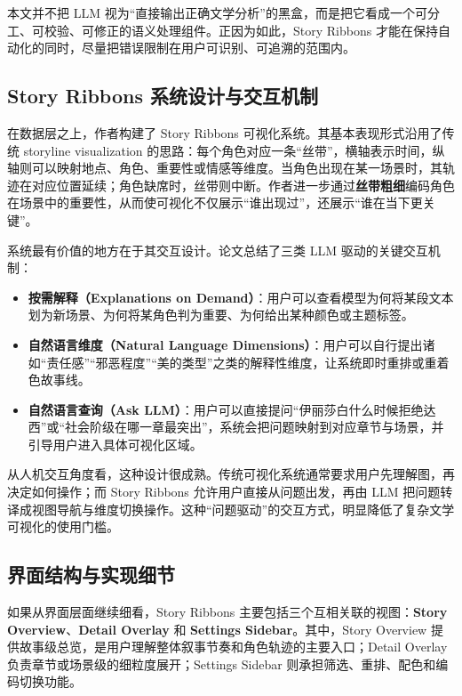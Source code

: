 \documentclass[a4paper,12pt,UTF8]{article}
\begin{document}
\begin{tcolorbox}[colback=gray!5!white,colframe=gray!60!black,title=流水线的关键思想]
本文并不把 LLM 视为“直接输出正确文学分析”的黑盒，而是把它看成一个可分工、可校验、可修正的语义处理组件。正因为如此，Story Ribbons 才能在保持自动化的同时，尽量把错误限制在用户可识别、可追溯的范围内。
\end{tcolorbox}

\subsection{Story Ribbons 系统设计与交互机制}
在数据层之上，作者构建了 Story Ribbons 可视化系统。其基本表现形式沿用了传统 storyline visualization 的思路：每个角色对应一条“丝带”，横轴表示时间，纵轴则可以映射地点、角色、重要性或情感等维度。当角色出现在某一场景时，其轨迹在对应位置延续；角色缺席时，丝带则中断。作者进一步通过\textbf{丝带粗细}编码角色在场景中的重要性，从而使可视化不仅展示“谁出现过”，还展示“谁在当下更关键”。

系统最有价值的地方在于其交互设计。论文总结了三类 LLM 驱动的关键交互机制：

\begin{itemize}
    \item \textbf{按需解释（Explanations on Demand）}：用户可以查看模型为何将某段文本划为新场景、为何将某角色判为重要、为何给出某种颜色或主题标签。
    \item \textbf{自然语言维度（Natural Language Dimensions）}：用户可以自行提出诸如“责任感”“邪恶程度”“美的类型”之类的解释性维度，让系统即时重排或重着色故事线。
    \item \textbf{自然语言查询（Ask LLM）}：用户可以直接提问“伊丽莎白什么时候拒绝达西”或“社会阶级在哪一章最突出”，系统会把问题映射到对应章节与场景，并引导用户进入具体可视化区域。
\end{itemize}

从人机交互角度看，这种设计很成熟。传统可视化系统通常要求用户先理解图，再决定如何操作；而 Story Ribbons 允许用户直接从问题出发，再由 LLM 把问题转译成视图导航与维度切换操作。这种“问题驱动”的交互方式，明显降低了复杂文学可视化的使用门槛。

\subsection{界面结构与实现细节}
如果从界面层面继续细看，Story Ribbons 主要包括三个互相关联的视图：\textbf{Story Overview}、\textbf{Detail Overlay} 和 \textbf{Settings Sidebar}。其中，Story Overview 提供故事级总览，是用户理解整体叙事节奏和角色轨迹的主要入口；Detail Overlay 负责章节或场景级的细粒度展开；Settings Sidebar 则承担筛选、重排、配色和编码切换功能。
\end{document}
